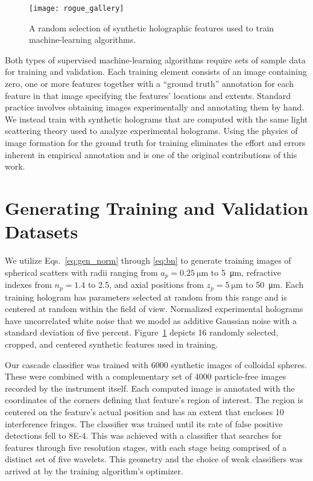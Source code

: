 \begin{figure}[b!]
  \centering
  \texttt{[image: rogue\_gallery]}	
  \caption{ A random selection of synthetic
  holographic features used to train machine-learning algorithms.} 
  \label{fig:rogue_gallery}
\end{figure}


Both types of supervised machine-learning algorithms 
require sets of sample data for training and validation.
Each training element
consists of an image containing
zero, one or more features together with
a ``ground truth'' annotation for each feature in that image
specifying the features' locations and extents.
Standard practice involves obtaining images experimentally
and annotating them by hand.
We instead train with synthetic holograms that are 
computed with the same light scattering theory \cite{lee07a}
used to analyze experimental holograms.
Using the physics of image formation
for the ground truth for training eliminates 
the effort and errors inherent in empirical annotation and is
one of the original contributions of this work.

\section{Generating Training and Validation Datasets}


We utilize Eqs.~\eqref{eq:gen_norm} through \eqref{eq:bn} to generate training 
images of spherical scatters with radii ranging from 
$a_p = \SI{0.25}{\um}$ to \SI{5}{\um}, refractive indexes from 
$n_p = \num{1.4}$ to \num{2.5}, and axial positions from 
$z_p = \SI{5}{\um}$ to \SI{50}{\um}. 
Each training hologram has parameters selected at 
random from this 
range and is centered at random within
the field of view.
Normalized experimental holograms have uncorrelated white
noise that we model as additive Gaussian noise with a standard
deviation of five percent. Figure~\ref{fig:rogue_gallery} depicts
\num{16} randomly selected, cropped, and centered synthetic features
used in training.

Our cascade classifier was trained with \num{6000}
synthetic images of colloidal spheres.
These were combined with a complementary set of 
\num{4000} particle-free images recorded by the instrument itself.
Each computed image is annotated with
the coordinates of the corners defining that feature's region of
interest.
The region is centered on the feature's actual position
and has an extent that encloses 10 interference fringes.
The classifier was trained
until its rate of false positive detections
fell to \num{8E-4}.
This was achieved with a classifier that searches for features
through five resolution stages, with each stage being
comprised of a distinct set of five wavelets.
This geometry and the choice of weak classifiers was arrived at
by the training algorithm's optimizer.

